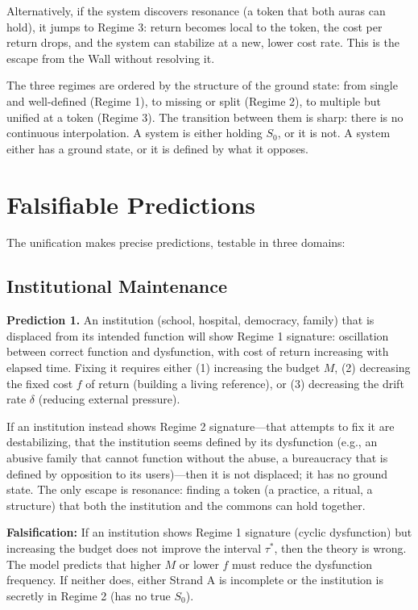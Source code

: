 \documentclass[12pt]{article}
\theoremstyle{definition}
\theoremstyle{remark}
\begin{document}
Alternatively, if the system discovers resonance (a token that both auras can hold), it jumps to Regime 3: return becomes local to the token, the cost per return drops, and the system can stabilize at a new, lower cost rate. This is the escape from the Wall without resolving it.

The three regimes are ordered by the structure of the ground state: from single and well-defined (Regime 1), to missing or split (Regime 2), to multiple but unified at a token (Regime 3). The transition between them is sharp: there is no continuous interpolation. A system is either holding $S_0$, or it is not. A system either has a ground state, or it is defined by what it opposes.

\section{Falsifiable Predictions}

The unification makes precise predictions, testable in three domains:

\subsection{Institutional Maintenance}

\textbf{Prediction 1.} An institution (school, hospital, democracy, family) that is displaced from its intended function will show Regime 1 signature: oscillation between correct function and dysfunction, with cost of return increasing with elapsed time. Fixing it requires either (1) increasing the budget $M$, (2) decreasing the fixed cost $f$ of return (building a living reference), or (3) decreasing the drift rate $\delta$ (reducing external pressure).

If an institution instead shows Regime 2 signature---that attempts to fix it are destabilizing, that the institution seems defined by its dysfunction (e.g., an abusive family that cannot function without the abuse, a bureaucracy that is defined by opposition to its users)---then it is not displaced; it has no ground state. The only escape is resonance: finding a token (a practice, a ritual, a structure) that both the institution and the commons can hold together.

\textbf{Falsification:} If an institution shows Regime 1 signature (cyclic dysfunction) but increasing the budget does not improve the interval $\tau^*$, then the theory is wrong. The model predicts that higher $M$ or lower $f$ must reduce the dysfunction frequency. If neither does, either Strand A is incomplete or the institution is secretly in Regime 2 (has no true $S_0$).
\end{document}
